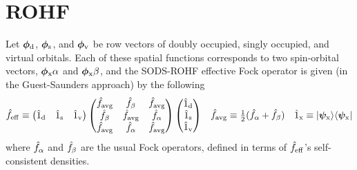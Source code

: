 \documentclass[11pt]{article}
\begin{document}
\section*{ROHF}

Let $\bm\f_\mr{d}$, $\bm\f_\mr{s}$, and $\bm\f_\mr{v}$ be row vectors of doubly occupied, singly occupied, and virtual orbitals.
Each of these spatial functions corresponds to two spin-orbital vectors, $\bm{\f}_\mr{x}\a$ and $\bm{\f}_\mr{x}\b$, and the SODS-ROHF effective Fock operator is given (in the Guest-Saunders approach) by the following
\begin{align}
  \op{f}_\mr{eff}
\equiv
  \ma{
    \op{1}_\mr{d} &
    \op{1}_\mr{s} &
    \op{1}_\mr{v}
  }
  \ma{
    \op{f}_\mr{avg} & \op{f}_\b       &  \op{f}_\mr{avg} \\
    \op{f}_\b       & \op{f}_\mr{avg} &  \op{f}_\a       \\
    \op{f}_\mr{avg} & \op{f}_\a       &  \op{f}_\mr{avg} \\
  }
  \ma{
    \op{1}_\mr{d} \\
    \op{1}_\mr{s} \\
    \op{1}_\mr{v} \\
  }
&&
  \op{f}_\mr{avg}
\equiv
  \tfr{1}{2}
  (
    \op{f}_\a
  +
    \op{f}_\b
  )
&&
  \op{1}_\mr{x}
\equiv
  \kt{\bm\y_\mr{x}}
  \br{\bm\y_\mr{x}}
\end{align}
where $\hat{f}_{\alpha }$ and $\hat{f}_{\beta }$ are the usual Fock operators, defined in terms of $\hat{f}_{\mathrm{eff}}$'s self-consistent densities.
\end{document}
